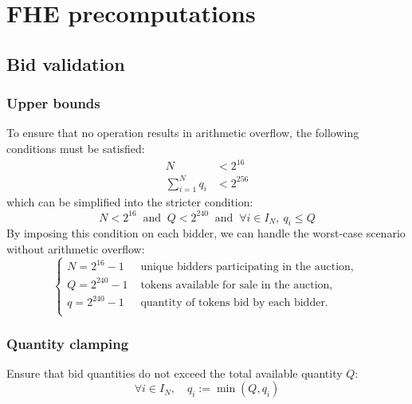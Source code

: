 \section{FHE precomputations}


\subsection{Bid validation}

\subsubsection{Upper bounds}
To ensure that no operation results in arithmetic overflow, the following conditions must be satisfied:
\begin{equation*}
    \begin{split}
        N &< 2^{16} \\
        \sum_{i=1}^{N} q_i &< 2^{256}
    \end{split}
\end{equation*}
which can be simplified into the stricter condition:
\begin{equation*}
    N < 2^{16} \ \text{ and } \ Q < 2^{240} \ \text{ and } \ \forall i \in I_N, \ q_i \le Q  
\end{equation*}
By imposing this condition on each bidder, we can handle the worst-case scenario without arithmetic overflow:
\begin{equation*}
    \begin{cases}
        N = 2^{16}-1 &\text { unique bidders participating in the auction, } \\
        Q = 2^{240}-1 &\text { tokens available for sale in the auction, } \\
        q = 2^{240}-1 &\text { quantity of tokens bid by each bidder. } \\
    \end{cases}
\end{equation*}

\subsubsection{Quantity clamping}
Ensure that bid quantities do not exceed the total available quantity $Q$:
\begin{equation*}
    \forall i \in I_N, \quad q_i := \min(Q, q_i) 
\end{equation*}

